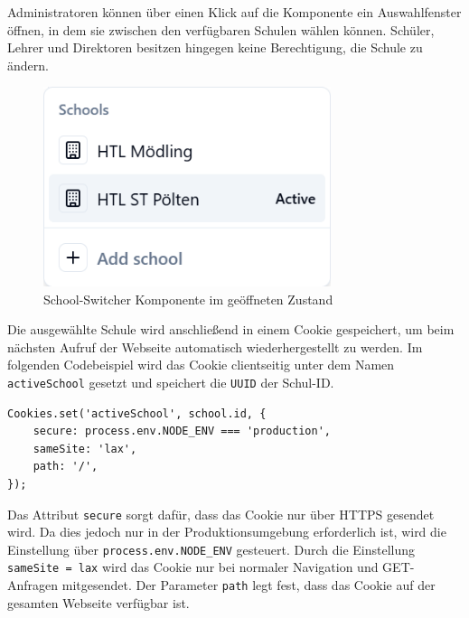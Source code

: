 \begin{inhalt}
\begin{enumerate}[label=\textbf{\arabic*.}]
Administratoren können über einen Klick auf die Komponente ein Auswahlfenster öffnen, in dem sie zwischen den verfügbaren Schulen wählen können.  
Schüler, Lehrer und Direktoren besitzen hingegen keine Berechtigung, die Schule zu ändern.

\begin{figure}[!htb]
\centering
\includegraphics[width=0.75\textwidth]{files/Thomas/pics/Website/Sidebar/school-switcher/school-switcher-open.png}
\caption[School-Switcher geöffnet]{School-Switcher Komponente im geöffneten Zustand}
\label{fig:school_switcher_open}
\end{figure}

\newpage

Die ausgewählte Schule wird anschließend in einem Cookie gespeichert, um beim nächsten Aufruf der Webseite automatisch wiederhergestellt zu werden.  
Im folgenden Codebeispiel wird das Cookie clientseitig unter dem Namen \texttt{activeSchool} gesetzt und speichert die \texttt{UUID} der Schul-ID.

\begin{lstlisting}[language=mytsx]
Cookies.set('activeSchool', school.id, {
    secure: process.env.NODE_ENV === 'production',
    sameSite: 'lax',
    path: '/',
});
\end{lstlisting}

Das Attribut \texttt{secure} sorgt dafür, dass das Cookie nur über HTTPS gesendet wird.  
Da dies jedoch nur in der Produktionsumgebung erforderlich ist, wird die Einstellung über \texttt{process.env.NODE\_ENV} gesteuert.  
Durch die Einstellung \texttt{sameSite = lax} wird das Cookie nur bei normaler Navigation und GET-Anfragen mitgesendet.  
Der Parameter \texttt{path} legt fest, dass das Cookie auf der gesamten Webseite verfügbar ist.










\end{enumerate}
\end{inhalt}
